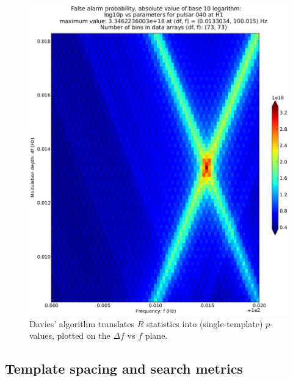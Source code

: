 \documentclass[12pt]{iopart}
\begin{document}
\begin{figure}
\begin{center}
\includegraphics[trim=20 20 20 80, clip, keepaspectratio,height=0.55\paperheight]{plots/Prob-4e21-on-4e24.eps}
\caption{Davies' algorithm translates $R$ statistics into (single-template) $p$-values, plotted on the $\Delta f$ vs $f$ plane.}
\label{inj_log10p}
\end{center}
\end{figure}

\subsection{Template spacing and search metrics}
\end{document}
